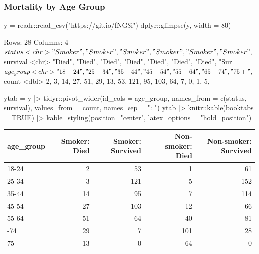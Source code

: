 \documentclass[a4paper]{article}\usepackage[]{graphicx}\usepackage[]{xcolor}
\begin{document}
\subsubsection{Mortality by Age Group}
\begin{Schunk}
\begin{Sinput}
y = readr::read_csv("https://git.io/fNGSi")
dplyr::glimpse(y, width = 80)
\end{Sinput}
\begin{Soutput}
Rows: 28
Columns: 4
$ status    <chr> "Smoker", "Smoker", "Smoker", "Smoker", "Smoker", "Smoker", ~
$ survival  <chr> "Died", "Died", "Died", "Died", "Died", "Died", "Died", "Sur~
$ age_group <chr> "18-24", "25-34", "35-44", "45-54", "55-64", "65-74", "75+",~
$ count     <dbl> 2, 3, 14, 27, 51, 29, 13, 53, 121, 95, 103, 64, 7, 0, 1, 5, ~
\end{Soutput}
\begin{Sinput}
ytab = y |>
  tidyr::pivot_wider(id_cols = age_group, 
                     names_from = c(status, survival), 
                     values_from = count,
                     names_sep = ": ")
ytab |> 
  knitr::kable(booktabs = TRUE) |>
  kable_styling(position="center", latex_options = "hold_position")
\end{Sinput}
\begin{table}[!h]
\centering
\begin{tabular}{lrrrr}
\toprule
age\_group & Smoker: Died & Smoker: Survived & Non-smoker: Died & Non-smoker: Survived\\
\midrule
18-24 & 2 & 53 & 1 & 61\\
25-34 & 3 & 121 & 5 & 152\\
35-44 & 14 & 95 & 7 & 114\\
45-54 & 27 & 103 & 12 & 66\\
55-64 & 51 & 64 & 40 & 81\\
\addlinespace
65-74 & 29 & 7 & 101 & 28\\
75+ & 13 & 0 & 64 & 0\\
\bottomrule
\end{tabular}
\end{table}




\end{Schunk}
\end{document}
